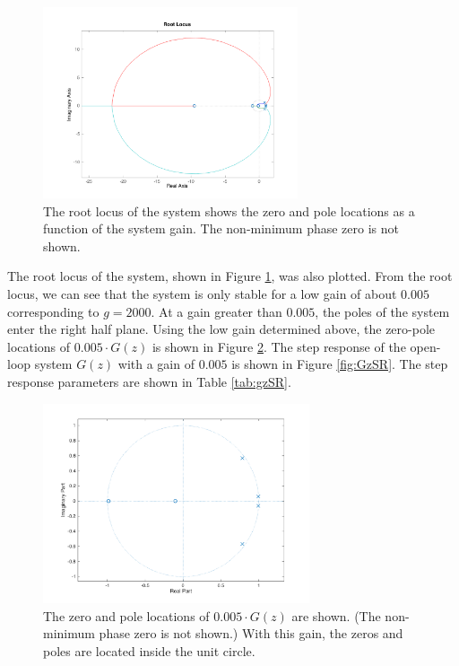\documentclass[11pt]{article}
\begin{document}
\begin{figure}[H]
    \centering
    \includegraphics[width=0.67\textwidth]{ECEN5458_gzRL.png}
    \caption{The root locus of the system shows the zero and pole locations as a function of the system gain. The non-minimum phase zero is not shown.} 
    \label{fig:GzRL}
\end{figure}

The root locus of the system, shown in Figure \ref{fig:GzRL}, was also plotted. From the root locus, we can see that the system is only stable for a low gain of about $0.005$ corresponding to $g=2000$. At a gain greater than $0.005$, the poles of the system enter the right half plane. Using the low gain determined above, the zero-pole locations of $0.005\cdot G(z)$ is shown in Figure \ref{fig:gzg_zp}. The step response of the open-loop system $G(z)$ with a gain of $0.005$ is shown in Figure \ref{fig:GzSR}. The step response parameters are shown in Table \ref{tab:gzSR}.

\begin{figure}[H]
    \centering
    \includegraphics[width=0.7\textwidth]{ECEN5458_gzg_zp.png}
    \caption{The zero and pole locations of $0.005\cdot G(z)$ are shown. (The non-minimum phase zero is not shown.) With this gain, the zeros and poles are located inside the unit circle.} 
    \label{fig:gzg_zp}
\end{figure}
\end{document}

